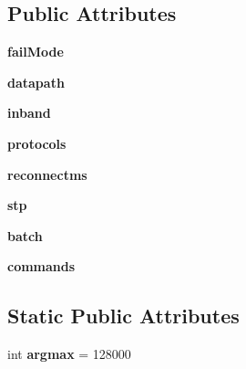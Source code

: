 \subsection*{Public Attributes}
\begin{DoxyCompactItemize}
\item 
\hypertarget{classmininet_1_1node_1_1OVSSwitch_a2a20caf43bb3fc4aab23025386d2c030}{{\bfseries fail\-Mode}}\label{classmininet_1_1node_1_1OVSSwitch_a2a20caf43bb3fc4aab23025386d2c030}

\item 
\hypertarget{classmininet_1_1node_1_1OVSSwitch_a7debf01783ed919fa2234f13c1982a43}{{\bfseries datapath}}\label{classmininet_1_1node_1_1OVSSwitch_a7debf01783ed919fa2234f13c1982a43}

\item 
\hypertarget{classmininet_1_1node_1_1OVSSwitch_a7e14ba5b1de8746f715b362c56200e4e}{{\bfseries inband}}\label{classmininet_1_1node_1_1OVSSwitch_a7e14ba5b1de8746f715b362c56200e4e}

\item 
\hypertarget{classmininet_1_1node_1_1OVSSwitch_a165ea494ac02c26dc67be5e357f41da3}{{\bfseries protocols}}\label{classmininet_1_1node_1_1OVSSwitch_a165ea494ac02c26dc67be5e357f41da3}

\item 
\hypertarget{classmininet_1_1node_1_1OVSSwitch_a675011761bb9860ef2681098139f930c}{{\bfseries reconnectms}}\label{classmininet_1_1node_1_1OVSSwitch_a675011761bb9860ef2681098139f930c}

\item 
\hypertarget{classmininet_1_1node_1_1OVSSwitch_aea9d7656773272b66ae551645be6e1b1}{{\bfseries stp}}\label{classmininet_1_1node_1_1OVSSwitch_aea9d7656773272b66ae551645be6e1b1}

\item 
\hypertarget{classmininet_1_1node_1_1OVSSwitch_a0f66cf402129bf13d83082c7139333f2}{{\bfseries batch}}\label{classmininet_1_1node_1_1OVSSwitch_a0f66cf402129bf13d83082c7139333f2}

\item 
\hypertarget{classmininet_1_1node_1_1OVSSwitch_aaa9afa54900f91c2140b961f34421004}{{\bfseries commands}}\label{classmininet_1_1node_1_1OVSSwitch_aaa9afa54900f91c2140b961f34421004}

\end{DoxyCompactItemize}
\subsection*{Static Public Attributes}
\begin{DoxyCompactItemize}
\item 
\hypertarget{classmininet_1_1node_1_1OVSSwitch_a7dfeb938c6038b8b47001ef6e9a78e44}{int {\bfseries argmax} = 128000}\label{classmininet_1_1node_1_1OVSSwitch_a7dfeb938c6038b8b47001ef6e9a78e44}

\end{DoxyCompactItemize}


